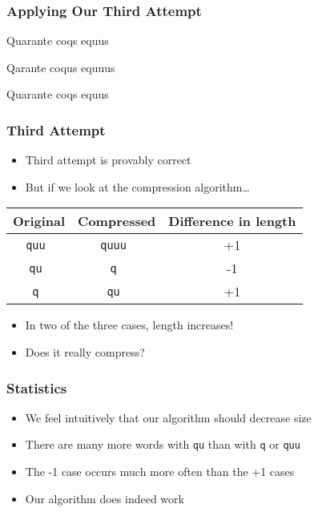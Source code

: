 \begin{frame}
  \frametitle{Applying Our Third Attempt}
  \begin{center}
    Quarante coqs equus
  \end{center}
  \vskip5mm
  \begin{center}
    Qarante coqus equuus
  \end{center}
  \vskip5mm
  \begin{center}
    Quarante coqs equus
  \end{center}
  \begin{center}
  \end{center}
\end{frame}

\begin{frame}
  \frametitle{Third Attempt}
  \begin{itemize}
    \item Third attempt is provably correct
    \item But if we look at the compression algorithm\dots
  \end{itemize}
  \begin{center}
    \begin{tabular}{ccc}
      \bf Original & \bf Compressed & \bf Difference in length \\
      \toprule
      \tt quu & \tt quuu & +1 \\
      \tt qu & \tt q & -1 \\
      \tt q & \tt qu & +1 \\
    \end{tabular}
  \end{center}
  \begin{itemize}
    \item In two of the three cases, length increases!
    \item Does it really compress?
  \end{itemize}
\end{frame}

\begin{frame}
  \frametitle{Statistics}
  \begin{itemize}
    \item We feel intuitively that our algorithm should decrease size
    \item There are many more words with {\tt qu} than with {\tt q} or {\tt quu}
    \item The -1 case occurs much more often than the +1 cases
    \item Our algorithm does indeed work
  \end{itemize}
\end{frame}


